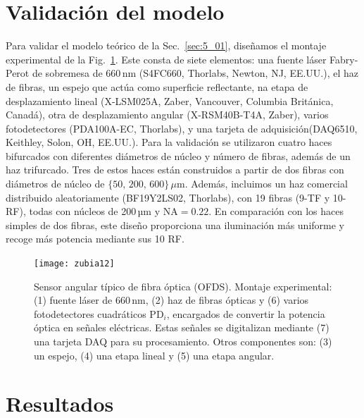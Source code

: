 \documentclass[11pt,a4paper]{article}
\begin{document}
\begin{multicols}{2}
\section{Validación del modelo}\label{sec:5_03}
Para validar el modelo teórico de la Sec.~\ref{sec:5_01}, diseñamos el montaje experimental de la Fig.~\ref{fig:5_12}. Este consta de siete elementos: una fuente láser Fabry-Perot de sobremesa de 660\,nm (S4FC660, Thorlabs, Newton, NJ, EE.UU.), el haz de fibras, un espejo que actúa como superficie reflectante, na etapa de desplazamiento lineal (X-LSM025A, Zaber, Vancouver, Columbia Británica, Canadá), otra de desplazamiento angular (X-RSM40B-T4A, Zaber), varios fotodetectores (PDA100A-EC, Thorlabs), y una tarjeta de adquisición(DAQ6510, Keithley, Solon, OH, EE.UU.). Para la validación se utilizaron cuatro haces bifurcados con diferentes diámetros de núcleo y número de fibras, además de un haz trifurcado. Tres de estos haces están construidos a partir de dos fibras con diámetros de núcleo de $\{50,\,200,\,600\}\,\mu\text{m}$. Además, incluimos un haz comercial distribuido aleatoriamente (BF19Y2LS02, Thorlabs), con 19 fibras (9-TF y 10-RF), todas con núcleos de 200\,µm y $\mathrm{NA} = 0.22$. En comparación con los haces simples de dos fibras, este diseño proporciona una iluminación más uniforme y recoge más potencia mediante sus 10 RF.
\begin{figure}[H]
    \centering
    \texttt{[image: zubia12]}
    \caption{Sensor angular típico de fibra óptica (OFDS).  Montaje experimental: (1) fuente láser de 660\,nm, (2) haz de fibras ópticas y (6) varios fotodetectores cuadráticos $\text{PD}_i$, encargados de convertir la potencia óptica en señales eléctricas. Estas señales se digitalizan mediante (7) una tarjeta DAQ para su procesamiento. Otros componentes son: (3) un espejo, (4) una etapa lineal y (5) una etapa angular.}
    \label{fig:5_12}
\end{figure}
\section{Resultados}\label{sec:5_04}

\end{multicols}
\end{document}
